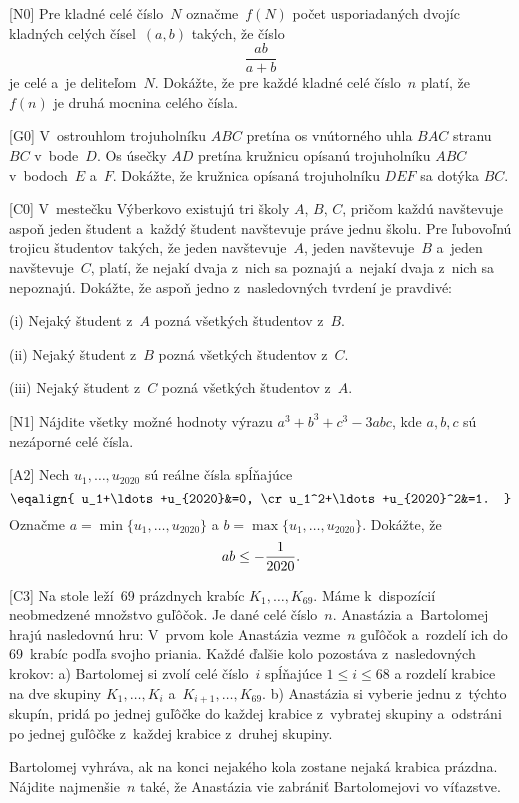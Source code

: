 {%
[N0] Pre kladné celé číslo~$N$ označme~$f(N)$ počet usporiadaných dvojíc kladných celých čísel~$(a,b)$ takých, že číslo
$$\frac{ab}{a+b}$$
je celé a~je deliteľom~$N$. Dokážte, že pre každé kladné celé číslo~$n$ platí, že $f(n)$ je druhá mocnina celého čísla.}

{%
[G0] V~ostrouhlom trojuholníku $ABC$ pretína os vnútorného uhla $BAC$ stranu~$BC$ v~bode~$D$. Os úsečky $AD$ pretína kružnicu opísanú trojuholníku $ABC$ v~bodoch~$E$ a~$F$. Dokážte, že kružnica opísaná trojuholníku $DEF$ sa dotýka $BC$.}

{%
[C0] V~mestečku Výberkovo existujú tri školy $A$, $B$, $C$, pričom každú navštevuje aspoň jeden študent a~každý študent navštevuje práve jednu školu. Pre ľubovoľnú trojicu študentov takých, že jeden navštevuje~$A$, jeden navštevuje~$B$ a~jeden navštevuje~$C$, platí, že nejakí dvaja z~nich sa poznajú a~nejakí dvaja z~nich sa nepoznajú. Dokážte, že aspoň jedno z~nasledovných tvrdení je pravdivé:
\item{(i)} Nejaký študent z~$A$ pozná všetkých študentov z~$B$.
\item{(ii)} Nejaký študent z~$B$ pozná všetkých študentov z~$C$.
\item{(iii)} Nejaký študent z~$C$ pozná všetkých študentov z~$A$.}

{%
[N1] Nájdite všetky možné hodnoty výrazu $a^3+b^3+c^3-3abc$, kde $a,b,c$ sú nezáporné celé čísla.}

{%
[A2] Nech $u_1,\ldots,u_{2020}$ sú reálne čísla spĺňajúce
$$
\eqalign{
u_1+\ldots+u_{2020}&=0, \cr
u_1^2+\ldots+u_{2020}^2&=1.
}
$$
Označme $a=\min\{u_1,\ldots,u_{2020}\}$ a $b=\max\{u_1,\ldots,u_{2020}\}$. Dokážte, že
$$
ab \leq -\frac1{2020}.
\belowdisplayskip0pt
$$}

{%
[C3] Na stole leží~69 prázdnych krabíc $K_1,\ldots,K_{69}$. Máme k~dispozícií neobme\-dze\-né množstvo guľôčok. Je dané celé číslo~$n$. Anastázia a~Bartolomej hrajú nasledovnú hru: V~prvom kole Anastázia vezme~$n$ guľôčok a~rozdelí ich do 69~krabíc podľa svojho priania. Každé ďalšie kolo pozostáva z~nasledovných krokov:
	\ite a) Bartolomej si zvolí celé číslo~$i$ spĺňajúce $1 \leq i \leq 68$ a rozdelí krabice na dve skupiny $K_1,\ldots,K_i$ a~$K_{i+1},\ldots,K_{69}$.
	\ite b) Anastázia si vyberie jednu z~týchto skupín, pridá po jednej guľôčke do každej krabice z~vybratej skupiny a~odstráni po jednej guľôčke z~každej krabice z~druhej skupiny.
	
Bartolomej vyhráva, ak na konci nejakého kola zostane nejaká krabica prázdna. Nájdite najmenšie~$n$ také, že Anastázia vie zabrániť Bartolomejovi vo víťazstve.}

